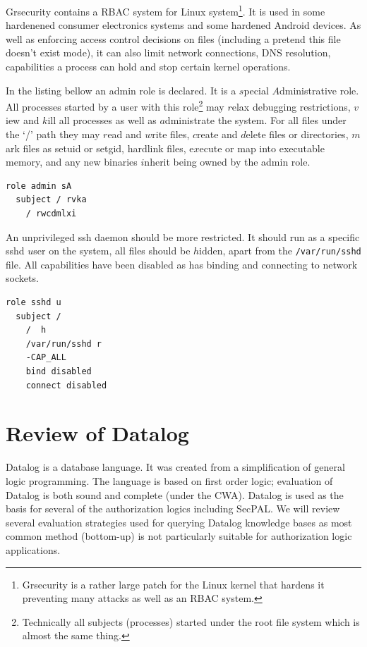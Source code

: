 \documentclass[a4paper]{article}
\begin{document}
Grsecurity contains a \ac{RBAC} system for Linux system\footnote{Grsecurity is
  a rather large patch for the Linux kernel that hardens it preventing many
  attacks as well as an \ac{RBAC} system.}.  It is used in some hardenened consumer
electronics systems and some hardened Android devices.  As well as enforcing
access control decisions on files (including a pretend this file doesn't exist
mode), it can also limit network connections, DNS
resolution, capabilities a process can hold and stop certain kernel operations.

In the listing bellow an admin role is declared.  It is a $s$pecial
$A$dministrative role.  All processes started by a user with this
role\footnote{Technically all subjects (processes) started under the root file
  system which is almost the same thing.} may $r$elax debugging restrictions,
  $v$iew and $k$ill all processes as well as $a$dministrate the system.
For all files under the `/' path they may $r$ead and $w$rite files, $c$reate and
$d$elete files or directories, $m$ark files as setuid or setgid, hardlink files,
e$x$ecute or map into executable memory, and any new binaries $i$nherit being
owned by the admin role.

\begin{lstlisting}[language=grsec]
role admin sA
  subject / rvka 
    / rwcdmlxi
\end{lstlisting}

An unprivileged ssh daemon should be more restricted.  It should run as a
specific sshd $u$ser on the system, all files should be $h$idden, apart from the
\texttt{/var/run/sshd} file.  All capabilities have been disabled as has binding
and connecting to network sockets.

\begin{lstlisting}[language=grsec]
role sshd u
  subject /
    /  h
    /var/run/sshd r
    -CAP_ALL
    bind disabled
    connect disabled
\end{lstlisting}
\section{Review of Datalog}
\label{sec:datalog}

Datalog is a database language. It was created from a simplification of general
logic programming.  The language is based on first order logic; evaluation of
Datalog is both sound and complete (under the \ac{CWA}).  Datalog is used as the
basis for several of the authorization logics including SecPAL. We will review
several evaluation strategies used for querying Datalog knowledge bases as most
common method (bottom-up) is not particularly suitable for authorization logic
applications.
\end{document}
